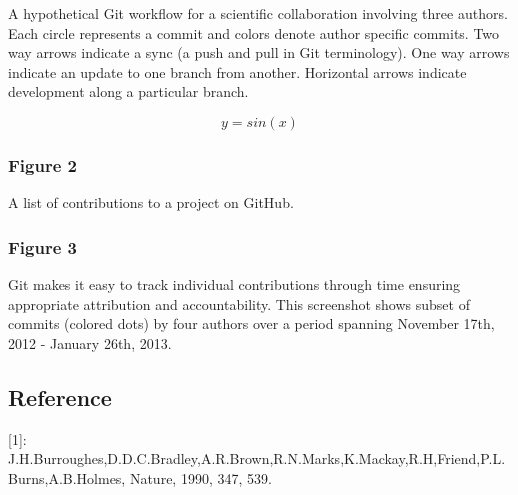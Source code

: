 \documentclass[]{article}
\begin{document}
A hypothetical Git workflow for a scientific collaboration involving
three authors. Each circle represents a commit and colors denote author
specific commits. Two way arrows indicate a sync (a push and pull in Git
terminology). One way arrows indicate an update to one branch from
another. Horizontal arrows indicate development along a particular
branch.

\[y=sin(x)\]

\subsubsection{Figure 2}

A list of contributions to a project on GitHub.

\subsubsection{Figure 3}

Git makes it easy to track individual contributions through time
ensuring appropriate attribution and accountability. This screenshot
shows subset of commits (colored dots) by four authors over a period
spanning November 17th, 2012 - January 26th, 2013.

\subsection{Reference}

{[}1{]}:
J.H.Burroughes,D.D.C.Bradley,A.R.Brown,R.N.Marks,K.Mackay,R.H,Friend,P.L.Burns,A.B.Holmes,
Nature, 1990, 347, 539.
\end{document}

